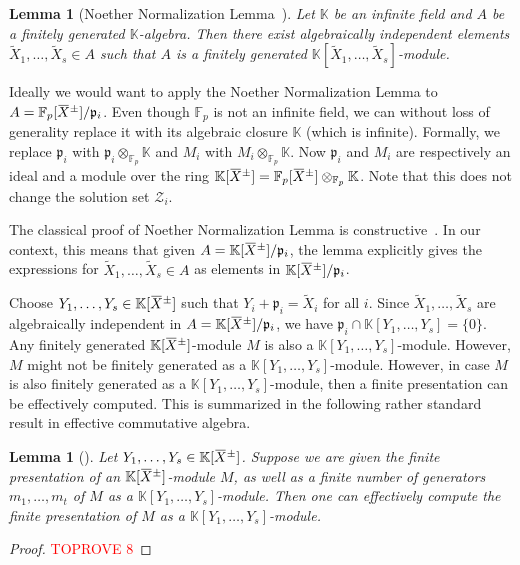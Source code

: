 \documentclass[a4paper,UKenglish,cleveref, autoref, thm-restate]{lipics-v2021}
\newcommand{\K}{\mathbb{K}}
\newcommand{\F}{\mathbb{F}}
\newcommand{\mZ}{\mathcal{Z}}
\newcommand{\oX}{\mkern 1.5mu\overline{\mkern-1.5mu X \mkern-1.5mu}\mkern 1.5mu}
\newcommand{\frp}{\mathfrak{p}}
\newtheorem{lem}[thrm]{Lemma}
\theoremstyle{definition}
\theoremstyle{definition}
\theoremstyle{definition}
\begin{document}
\begin{lem}[{Noether Normalization Lemma~\cite[p.2]{mumford2004red}}]\label{lem:Noether}
    Let $\K$ be an infinite field and $A$ be a finitely generated $\K$-algebra. Then there exist algebraically independent elements $\widetilde{X}_1, \ldots, \widetilde{X}_s \in A$ such that $A$ is a finitely generated $\K[\widetilde{X}_1, \ldots, \widetilde{X}_s]$-module.
\end{lem}

Ideally we would want to apply the Noether Normalization Lemma to $A = \F_p[\oX^{\pm}]/\frp_i$. Even though $\F_p$ is not an infinite field, we can without loss of generality replace it with its algebraic closure $\K$ (which is infinite).
Formally, we replace $\frp_i$ with $\frp_i \otimes_{\F_p} \K$ and $M_i$ with $M_i \otimes_{\F_p} \K$.
Now $\frp_i$ and $M_i$ are respectively an ideal and a module over the ring $\K[\oX^{\pm}] = \F_p[\oX^{\pm}] \otimes_{\F_p} \K$. Note that this does not change the solution set $\mZ_i$.

The classical proof of Noether Normalization Lemma is constructive~\cite[p.2]{mumford2004red}.
In our context, this means that given $A = \K[\oX^{\pm}]/\frp_i$, the lemma explicitly gives the expressions for $\widetilde{X}_1, \ldots, \widetilde{X}_s \in A$ as elements in $\K[\oX^{\pm}]/\frp_i$.


Choose $Y_1, \ldots, Y_s \in \K[\oX^{\pm}]$ such that $Y_i + \frp_i = \widetilde{X}_i$ for all $i$.
Since $\widetilde{X}_1, \ldots, \widetilde{X}_s$ are algebraically independent in $A = \K[\oX^{\pm}]/\frp_i$, we have $\frp_i \cap \K[Y_1, \ldots, Y_s] = \{0\}$.
Any finitely generated $\K[\oX^{\pm}]$-module $M$ is also a $\K[Y_1, \ldots, Y_s]$-module. However, $M$ might not be finitely generated as a $\K[Y_1, \ldots, Y_s]$-module.
However, in case $M$ is also finitely generated as a $\K[Y_1, \ldots, Y_s]$-module, then a finite presentation can be effectively computed.
This is summarized in the following rather standard result in effective commutative algebra.



\begin{lem}[{\cite[Section~2]{baumslag1981computable}}]\label{lem:eff}
    Let $Y_1, \ldots, Y_s \in \K[\oX^{\pm}]$.
    Suppose we are given the finite presentation of an $\K[\oX^{\pm}]$-module $M$, as well as a finite number of generators $m_1, \ldots, m_t$ of $M$ as a $\K[Y_1, \ldots, Y_s]$-module.
    Then one can effectively compute the finite presentation of $M$ as a $\K[Y_1, \ldots, Y_s]$-module.
\end{lem}
\begin{proof}\textcolor{red}{TOPROVE 8}\end{proof}
\end{document}
